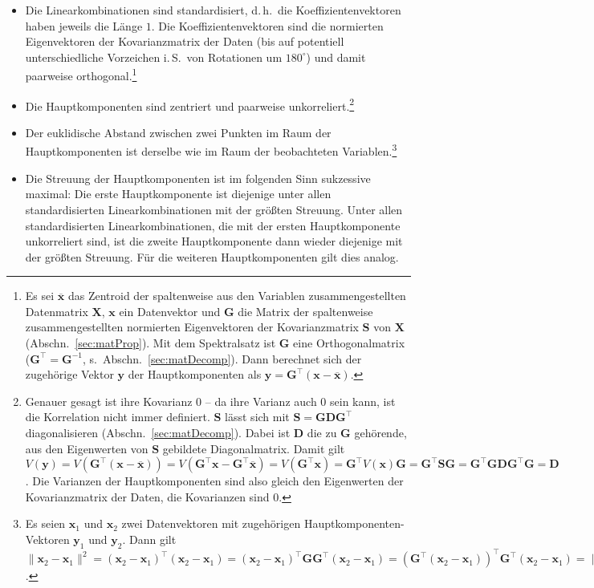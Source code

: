 \begin{itemize}
\item Die Linearkombinationen sind standardisiert, d.\,h.\ die Koeffizientenvektoren haben jeweils die Länge $1$. Die Koeffizientenvektoren sind die normierten Eigenvektoren der Kovarianzmatrix der Daten (bis auf potentiell unterschiedliche Vorzeichen i.\,S.\ von Rotationen um $180^{\circ}$) und damit paarweise orthogonal.\footnote{Es sei $\overline{\bm{x}}$ das Zentroid der spaltenweise aus den Variablen zusammengestellten Datenmatrix $\bm{X}$, $\bm{x}$ ein Datenvektor und $\bm{G}$ die Matrix der spaltenweise zusammengestellten normierten Eigenvektoren der Kovarianzmatrix $\bm{S}$ von $\bm{X}$ (Abschn.\ \ref{sec:matProp}). Mit dem Spektralsatz ist $\bm{G}$ eine Orthogonalmatrix ($\bm{G}^{\top} = \bm{G}^{-1}$, s.\ Abschn.\ \ref{sec:matDecomp}). Dann berechnet sich der zugehörige Vektor $\bm{y}$ der Hauptkomponenten als $\bm{y} = \bm{G}^{\top} (\bm{x} - \overline{\bm{x}})$.}
\item Die Hauptkomponenten sind zentriert und paarweise unkorreliert.\footnote{Genauer gesagt ist ihre Kovarianz $0$ -- da ihre Varianz auch $0$ sein kann, ist die Korrelation nicht immer definiert. $\bm{S}$ lässt sich mit $\bm{S} = \bm{G} \bm{D} \bm{G}^{\top}$ diagonalisieren (Abschn.\ \ref{sec:matDecomp}). Dabei ist $\bm{D}$ die zu $\bm{G}$ gehörende, aus den Eigenwerten von $\bm{S}$ gebildete Diagonalmatrix. Damit gilt $V(\bm{y}) = V(\bm{G}^{\top} (\bm{x} - \overline{\bm{x}})) = V(\bm{G}^{\top} \bm{x} - \bm{G}^{\top} \overline{\bm{x}}) = V(\bm{G}^{\top} \bm{x}) = \bm{G}^{\top} V(\bm{x}) \bm{G} = \bm{G}^{\top} \bm{S} \bm{G} = \bm{G}^{\top} \bm{G} \bm{D} \bm{G}^{\top} \bm{G} = \bm{D}$. Die Varianzen der Hauptkomponenten sind also gleich den Eigenwerten der Kovarianzmatrix der Daten, die Kovarianzen sind $0$.}
\item Der euklidische Abstand zwischen zwei Punkten im Raum der Hauptkomponenten ist derselbe wie im Raum der beobachteten Variablen.\footnote{Es seien $\bm{x}_{1}$ und $\bm{x}_{2}$ zwei Datenvektoren mit zugehörigen Hauptkomponenten-Vektoren $\bm{y}_{1}$ und $\bm{y}_{2}$. Dann gilt $\|\bm{x}_{2} - \bm{x}_{1}\|^{2} = (\bm{x}_{2} - \bm{x}_{1})^{\top} (\bm{x}_{2} - \bm{x}_{1}) = (\bm{x}_{2} - \bm{x}_{1})^{\top} \bm{G} \bm{G}^{\top} (\bm{x}_{2} - \bm{x}_{1}) = (\bm{G}^{\top} (\bm{x}_{2} - \bm{x}_{1}))^{\top} \bm{G}^{\top} (\bm{x}_{2} - \bm{x}_{1}) = \|\bm{G}^{\top} (\bm{x}_{2} - \bm{x}_{1})\|^{2} = \|\bm{G}^{\top} \bm{x}_{2} - \bm{G}^{\top} \bm{x}_{1}\|^{2} = \|\bm{G}^{\top} (\bm{x}_{2} - \overline{\bm{x}}) - \bm{G}^{\top} (\bm{x}_{1} - \overline{\bm{x}})\|^{2} = \|\bm{y}_{2} - \bm{y}_{1} \|^{2}$.}
\item Die Streuung der Hauptkomponenten ist im folgenden Sinn sukzessive maximal: Die erste Hauptkomponente ist diejenige unter allen standardisierten Linearkombinationen mit der größten Streuung. Unter allen standardisierten Linearkombinationen, die mit der ersten Hauptkomponente unkorreliert sind, ist die zweite Hauptkomponente dann wieder diejenige mit der größten Streuung. Für die weiteren Hauptkomponenten gilt dies analog.
\end{itemize}

